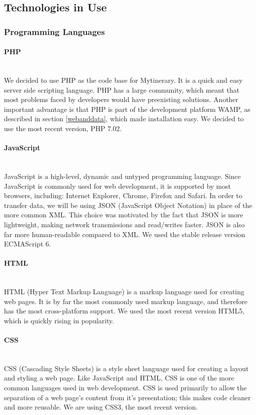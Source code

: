 \documentclass[12pt]{article}
\begin{document}
\subsection{Technologies in Use} \label{techInUse}
%
%
\subsubsection{Programming Languages} \label{languages}
\paragraph*{PHP}~\\
We decided to use PHP as the code base for Mytinerary. It is a quick and easy server side scripting language. PHP has a large community, which meant that most problems faced by developers would have preexisting solutions. Another important advantage is that PHP is part of the development platform WAMP, as described in section \ref{webanddata}, which made installation easy. We decided to use the most recent version, PHP 7.02.
%
\paragraph*{JavaScript}~\\
JavaScript is a high-level, dynamic and untyped programming language. Since JavaScript is commonly used for web development, it is supported by most browsers, including: Internet Explorer, Chrome, Firefox and Safari. In order to transfer data, we will be using JSON (JavaScript Object Notation) in place of the more common XML. This choice was motivated by the fact that JSON is more lightweight, making network transmissions and read/writes faster. JSON is also far more human-readable compared to XML. We used the stable release version ECMAScript 6.
%
\paragraph*{HTML}~\\
HTML (Hyper Text Markup Language) is a markup language used for creating web pages. It is by far the most commonly used markup language, and therefore has the most cross-platform support. We used the most recent version HTML5, which is quickly rising in popularity. 
%
\paragraph*{CSS}~\\
CSS (Cascading Style Sheets) is a style sheet language used for creating a layout and styling a web page. Like JavaScript and HTML, CSS is one of the more common languages used in web development. CSS is used primarily to allow the separation of a web page's content from it's presentation; this makes code cleaner and more reusable. We are using CSS3, the most recent version.
%
\end{document}
